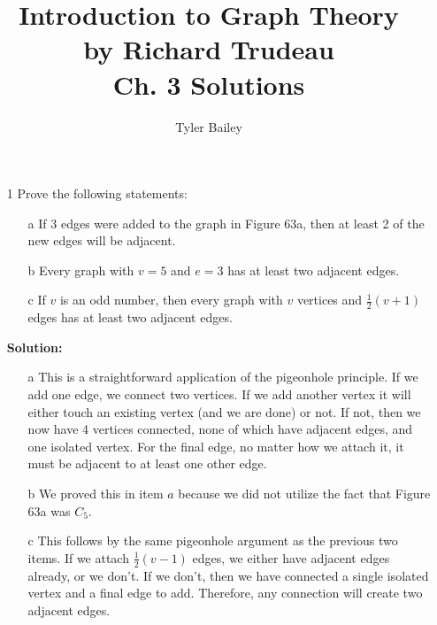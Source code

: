 \documentclass{article}
\begin{document}
\title{%
  Introduction to Graph Theory \\
  \large by Richard Trudeau \\
   Ch. 3 Solutions}
   \author{Tyler Bailey}
\maketitle

\begin{enumerate}
	\item[1] Prove the following statements:
	
	\begin{enumerate}
		\item[a] If 3 edges were added to the graph in Figure 63a, then at least 2 of the new edges will be adjacent.
		\item[b] Every graph with $v = 5$ and $e = 3$ has at least two adjacent edges.
		\item[c] If $v$ is an odd number, then every graph with $v$ vertices and $\frac{1}{2}(v + 1)$ edges has at least two adjacent edges.
	\end{enumerate}
	
	\textbf{Solution:}
	\begin{enumerate}
		\item[a] This is a straightforward application of the pigeonhole principle. If we add one edge, we connect two vertices. If we add another vertex it will either touch an existing vertex (and we are done) or not. If not, then we now have 4 vertices connected, none of which have adjacent edges, and one isolated vertex. For the final edge, no matter how we attach it, it must be adjacent to at least one other edge.
		\item[b] We proved this in item $a$ because we did not utilize the fact that Figure 63a was $C_5$.
		\item[c] This follows by the same pigeonhole argument as the previous two items. If we attach $\frac{1}{2}(v - 1)$ edges, we either have adjacent edges already, or we don't. If we don't, then we have connected a single isolated vertex and a final edge to add. Therefore, any connection will create two adjacent edges.
	\end{enumerate}
\end{enumerate}
\end{document}
